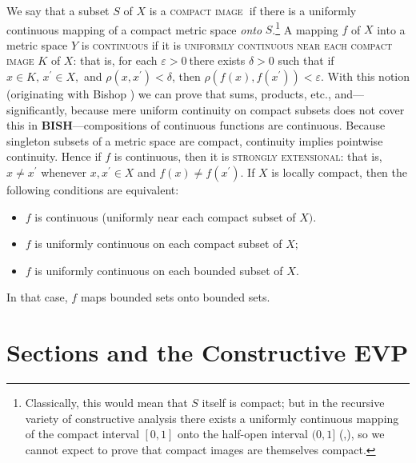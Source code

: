 \documentclass[11pt]{article}%
\begin{document}
We say that a subset $S$ of $X$ is a \textsc{compact image}\textbf{\ }if there
is a uniformly continuous mapping of a compact metric space \emph{onto}
$S$.\footnote{%
\normalfont\sf
Classically, this would mean that $S$ itself is compact; but in the recursive
variety of constructive analysis there exists a uniformly continuous mapping
of the compact interval $\left[  0,1\right]  $ onto the half-open interval
$(0,1]$ (\cite{JR1984},\cite[pp. 134--136]{BR}), so we cannot expect to prove
that compact images are themselves compact.} A mapping $f$ of $X$ into a
metric space $Y$ is \textsc{continuous} if it is \textsc{uniformly continuous
near each compact image} $K$ of $X$: that is, for each $\varepsilon>0\ $there
exists $\delta>0$ such that if $x\in K,\,x^{\prime}\in X,$ and $\rho
(x,x^{\prime})<\delta$, then $\rho(f(x),f(x^{\prime}))<\varepsilon$. With this
notion (originating with Bishop \cite{Bishneat}) we can prove that sums,
products, etc., and---significantly, because mere uniform continuity on
compact subsets does not cover this in \textbf{BISH}---compositions of
continuous functions are continuous. Because singleton subsets of a metric
space are compact, continuity implies pointwise continuity. Hence if $f$ is
continuous, then it is \textsc{strongly extensional}: that is, $x\neq
x^{\prime}$ whenever $x,x^{\prime}\in X$ and $f(x)\neq f(x^{\prime})$. If $X$
is locally compact, then the following conditions are equivalent:

\begin{itemize}
\item[$\bullet$] $f$ is continuous (uniformly near each compact subset of
$X).$

\item[$\bullet$] $f$ is uniformly continuous on each compact subset of $X;$

\item[$\bullet$] $f$ is uniformly continuous on each bounded subset of $X$.
\end{itemize}

%

\noindent
In that case, $f$ maps bounded sets onto bounded sets.

\section{Sections and the Constructive EVP}
\end{document}
